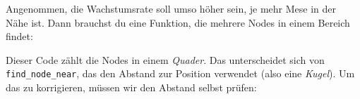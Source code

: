 \begin{Shaded}
\begin{Highlighting}[]
  \OperatorTok{=} 
  \OperatorTok{=}
    \OperatorTok{(}\OperatorTok{,} \OperatorTok{,} \OperatorTok{\{}  \OperatorTok{\})}
  
    \OperatorTok{(}
          \OperatorTok{(}\OperatorTok{)}
    \OperatorTok{)}
     \OperatorTok{=} 
\end{Highlighting}
\end{Shaded}

Angenommen, die Wachstumsrate soll umso höher sein, je mehr Mese in der
Nähe ist. Dann brauchst du eine Funktion, die mehrere Nodes in einem
Bereich findet:

\begin{Shaded}
\begin{Highlighting}[]
  \OperatorTok{=} \OperatorTok{(}\OperatorTok{,} \OperatorTok{\{}  \OperatorTok{=} \OperatorTok{,}  \OperatorTok{=} \OperatorTok{,}  \OperatorTok{=}  \OperatorTok{\})}
  \OperatorTok{=} \OperatorTok{(}\OperatorTok{,} \OperatorTok{\{}  \OperatorTok{=} \OperatorTok{,}  \OperatorTok{=} \OperatorTok{,}  \OperatorTok{=}  \OperatorTok{\})}
  \OperatorTok{=}
    \OperatorTok{(}\OperatorTok{,} \OperatorTok{,} \OperatorTok{\{}  \OperatorTok{\})}
  \OperatorTok{=}  \OperatorTok{+} \OperatorTok{\#}
\end{Highlighting}
\end{Shaded}

Dieser Code zählt die Nodes in einem \emph{Quader}. Das unterscheidet
sich von \texttt{find\_\allowbreak{}node\_\allowbreak{}near}, das den
Abstand zur Position verwendet (also eine \emph{Kugel}). Um das zu
korrigieren, müssen wir den Abstand selbst prüfen:

